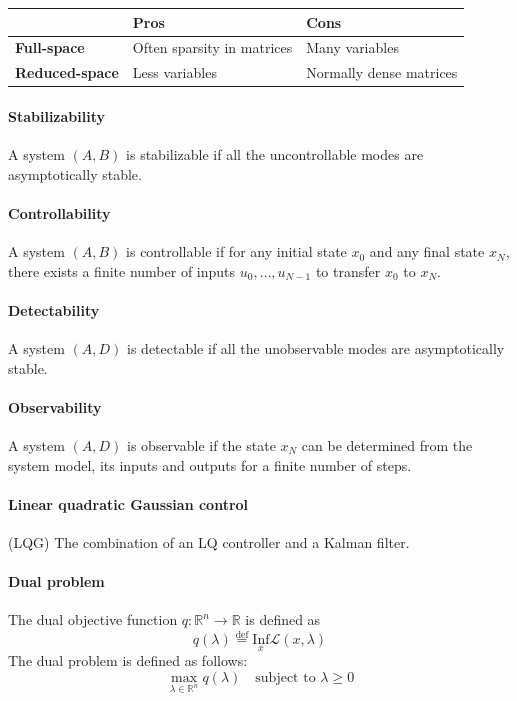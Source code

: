 \hskip-0.5cm
\begin{tabularx}{\linewidth}{X X X}
	& \textbf{Pros} & \textbf{Cons}\\
	\hline
	\textbf{Full-space} & Often sparsity in matrices & Many variables\\
	\textbf{Reduced-space} & Less variables & Normally dense matrices
\end{tabularx}

\paragraph{Stabilizability} A system $(A,B)$ is stabilizable if all the uncontrollable modes are asymptotically stable.

\paragraph{Controllability} A system $(A,B)$ is controllable if for any initial state $x_0$ and any final state $x_N$, there exists a finite number of inputs $u_0, \dots, u_{N-1}$ to transfer $x_0$ to $x_N$.

\paragraph{Detectability}
A system $(A,D)$ is detectable if all the unobservable modes are asymptotically stable.

\paragraph{Observability} A system $(A,D)$ is observable if the state $x_N$ can be determined from the system model, its inputs and outputs for a finite number of steps.

\paragraph{Linear quadratic Gaussian control} (LQG) The combination of an LQ controller and a Kalman filter.

\paragraph{Dual problem}
The dual objective function $q: \mathbb{R}^n \rightarrow \mathbb{R}$ is defined as
%
\begin{equation}
    q(\lambda) \overset{\mathrm{def}}{=} \underset{x}{\mathrm{Inf}} \mathcal{L}(x, \lambda)
\end{equation}
%
The dual problem is defined as follows:
\begin{equation}
    \underset{\lambda \in \mathbb{R}^n}{\max} q(\lambda) \quad \text{subject to } \lambda \geq 0
\end{equation}